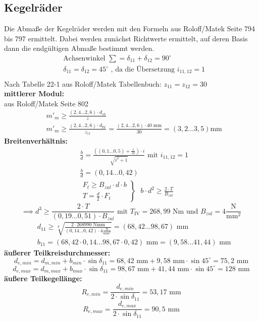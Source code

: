 \subsection{Kegelräder}
Die Abmaße der Kegelräder werden mit den Formeln aus Roloff/Matek Seite 794 bis 797 ermittelt. Dabei werden zunächst Richtwerte ermittelt, auf deren Basis dann die endgültigen Abmaße bestimmt werden.
\begin{align*}
	&\text{Achsenwinkel } \sum = \delta_{11} + \delta_{12} = 90^\circ \\
	&\delta_{11}= \delta_{12} =  45^\circ \text{ , da die Übersetzung } i_{11,12} =1\\
\end{align*}
Nach Tabelle 22-1 aus Roloff/Matek Tabellenbuch: $z_{11} = z_{12} = 30$ \\
\textbf{mittlerer Modul:}\\
aus Roloff/Matek Seite 802
\begin{align*}
	&m'_m \ge \frac{\left(2,4...2,6\right) \cdot d_{sh}}{z} \\
	&m'_m \ge \frac{\left(2,4...2,6\right) \cdot d_{\mathrm{IV}}}{z_{11}} = \frac{\left(2,4...2,6\right) \cdot 40\text{ mm}}{30} = (3,2...3,5) \text{mm} 
\end{align*}
\textbf{Breitenverhältnis:}
\begin{align*}
	&\frac{b}{d} = \frac{\left((0,1...0,5)+ \frac{i}{10}\right) \cdot i}{\sqrt{i^2 + 1}} \text{ mit } i_{11,12} = 1 \\
	&\frac{b}{d} = (0,14...0,42) \\
	&\left. \begin{array}{c} F_t \ge B_{zul} \cdot d \cdot b\\T = \frac{d}{2} \cdot F_t \end{array} \right\} \text{ }b \cdot d^2 \ge \frac{2 \cdot T}{B_{zul}} 
\end{align*}
\[
\implies d^3 \ge \frac{2 \cdot T}{(0,19...0,51) \cdot B_{zul}} \text{ mit } T_{\mathrm{IV}} = 268,99 \text{ Nm und  } B_{zul} = 4 \frac{\text{N}}{\text{mm}^2}
\]
\begin{align*}
	&d_{11} \ge \sqrt[3]{\frac{2 \cdot 268990 \text{ Nmm}}{(0,14...0,42) \cdot  4 \frac{\text{N}}{\text{mm}^2}}}= (68,42...98,67) \text{ mm} \\
	&b_{11} = (68,42 \cdot 0,14 ...98,67 \cdot 0,42) \text{ mm} = (9,58...41,44) \text{ mm}
\end{align*}
\textbf{äußerer Teilkreisdurchmesser:}
\[
d_{e,min} = d_{m,min} + b_{min}\cdot\sin\delta_{11} = 68,42 \text{ mm} + 9,58 \text{ mm} \cdot \sin 45^\circ =75,2 \text{ mm}
\]
\[
d_{e,max} = d_{m,max} + b_{max}\cdot\sin\delta_{11} =98,67 \text{ mm} + 41,44 \text{ mm} \cdot \sin 45^\circ =128 \text{ mm}
\]
\textbf{äußere Teilkegellänge:}
\[
R_{e,min} = \frac{d_{e,min}}{2 \cdot \sin \delta_{11}} = 53,17 \text{ mm}
\]
\[
R_{e,max} = \frac{d_{e,max}}{2 \cdot \sin \delta_{11}} = 90,5 \text{ mm}
\]

